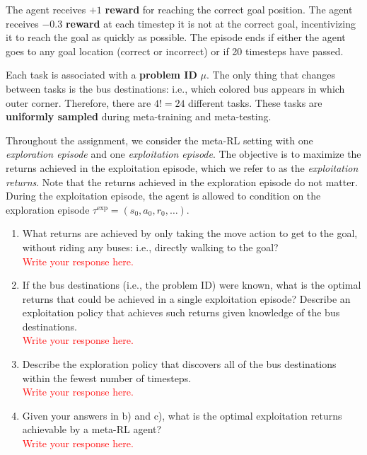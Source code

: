 \documentclass[12pt]{article}
\begin{document}
The agent receives $+1$ \textbf{reward} for reaching the correct goal position.
The agent receives $-0.3$ \textbf{reward} at each timestep it is not at the correct goal, incentivizing it to reach the goal as quickly as possible.
The episode ends if either the agent goes to any goal location (correct or incorrect) or if 20 timesteps have passed.

Each task is associated with a \textbf{problem ID} $\mu$. The only thing that changes between tasks is the bus destinations: i.e., which colored bus appears in which outer corner. Therefore, there are $4! = 24$ different tasks. These tasks are \textbf{uniformly sampled} during meta-training and meta-testing.

Throughout the assignment, we consider the meta-RL setting with one \emph{exploration episode} and one \emph{exploitation episode}.
The objective is to maximize the returns achieved in the exploitation episode, which we refer to as the \emph{exploitation returns}.
Note that the returns achieved in the exploration episode do not matter.
During the exploitation episode, the agent is allowed to condition on the exploration episode $\tau^\text{exp} = (s_0, a_0, r_0, \ldots)$.

\begin{enumerate}
    \item What returns are achieved by only taking the move action to get to the goal, without riding any buses: i.e., directly walking to the goal? \\
    \textcolor{red}{Write your response here.}
    \item If the bus destinations (i.e., the problem ID) were known, what is the optimal returns that could be achieved in a single exploitation episode? Describe an exploitation policy that achieves such returns given knowledge of the bus destinations. \\
    \textcolor{red}{Write your response here.}
    \item Describe the exploration policy that discovers all of the bus destinations within the fewest number of timesteps. \\
    \textcolor{red}{Write your response here.}
    \item Given your answers in b) and c), what is the optimal exploitation returns achievable by a meta-RL agent? \\
    \textcolor{red}{Write your response here.}
\end{enumerate}
\end{document}
